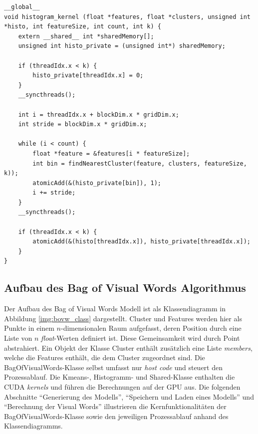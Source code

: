 \lstset{language=C}
\begin{lstlisting}
__global__
void histogram_kernel (float *features, float *clusters, unsigned int *histo, int featureSize, int count, int k) {
	extern __shared__ int *sharedMemory[];
	unsigned int histo_private = (unsigned int*) sharedMemory;
	
	if (threadIdx.x < k) {
		histo_private[threadIdx.x] = 0;		
	}
	__syncthreads();

	int i = threadIdx.x + blockDim.x * gridDim.x;
	int stride = blockDim.x * gridDim.x;
	
	while (i < count) {
		float *feature = &features[i * featureSize];
		int bin = findNearestCluster(feature, clusters, featureSize, k)); 
		atomicAdd(&(histo_private[bin]), 1);
		i += stride;	
	}
	__syncthreads();
	
	if (threadIdx.x < k) {
		atomicAdd(&(histo[threadIdx.x]), histo_private[threadIdx.x]);		
	}
}
\end{lstlisting} 

\subsection{Aufbau des Bag of Visual Words Algorithmus}

Der Aufbau des Bag of Visual Words Modell ist als Klassendiagramm in Abbildung \ref{img:bovw_class} dargestellt. Cluster und Features werden hier als Punkte in einem $n$-dimensionalen Raum aufgefasst, deren Position durch eine Liste von $n$ \textit{float}-Werten definiert ist. Diese Gemeinsamkeit wird durch Point abstrahiert. Ein Objekt der Klasse Cluster enthält zusätzlich eine Liste \textit{members}, welche die Features enthält, die dem Cluster zugeordnet sind.
Die BagOfVisualWords-Klasse selbst umfasst nur \textit{host code} und steuert den Prozessablauf. Die Kmeans-, Histogramm- und Shared-Klasse enthalten die CUDA \textit{kernels} und führen die Berechnungen auf der GPU aus.\newline
Die folgenden Abschnitte \enquote{Generierung des Modells}, \enquote{Speichern und Laden eines Modells} und \enquote{Berechnung der Visual Words} illustrieren die Kernfunktionalitäten der BagOfVisualWords-Klasse sowie den jeweiligen Prozessablauf anhand des Klassendiagramms.

